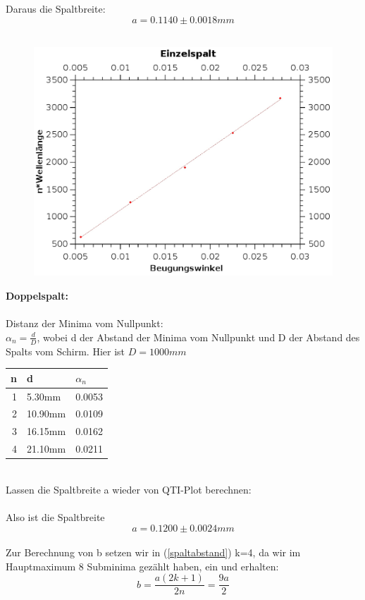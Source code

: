 \documentclass{article}
\begin{document}
Daraus die Spaltbreite: 
$$\boxed{a=0.1140 \pm 0.0018mm}$$\\
\begin{center}
\begin{figure}
\includegraphics[scale=0.7]{einzelspalt.eps}
\end{figure}
\end{center}
\textbf{Doppelspalt:}\\
\\
Distanz der Minima vom Nullpunkt:\\
$\alpha_n=\frac{d}{D}$, wobei d der Abstand der Minima vom Nullpunkt und D der Abstand des Spalts vom Schirm. Hier ist $D=1000mm$\\
\begin{tabular}{|r|l|l|}
\hline
n & d & $\alpha_n$\\
\hline
1 & 5.30mm & 0.0053\\
2 & 10.90mm & 0.0109\\
3 & 16.15mm & 0.0162\\
4 & 21.10mm & 0.0211\\
\hline
\end{tabular}
\vspace{0.8cm}
\\Lassen die Spaltbreite a wieder von QTI-Plot berechnen:\\
\\
Also ist die Spaltbreite
$$\boxed{a=0.1200 \pm 0.0024 mm}$$
\\
Zur Berechnung von b setzen wir in (\ref{spaltabstand}) k=4, da wir im Hauptmaximum 8 Subminima gezählt haben, ein und erhalten:
$$b=\frac{a(2k+1)}{2n}=\frac{9a}{2}$$
\end{document}
